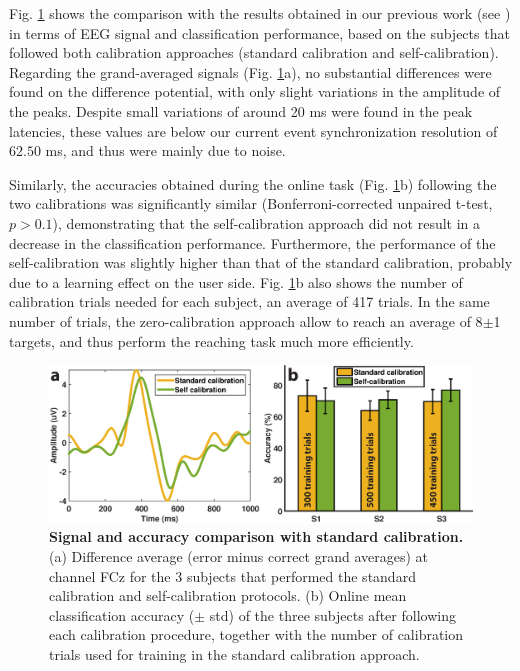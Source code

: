 Fig. \ref{fig:std_vs_sc} shows the comparison with the results obtained in our previous work (see \cite{iturrate13}) in terms of EEG signal and classification performance, based on the subjects that followed both calibration approaches (standard calibration and self-calibration). Regarding the grand-averaged signals (Fig. \ref{fig:std_vs_sc}a), no substantial differences were found on the difference potential, with only slight variations in the amplitude of the peaks. Despite small variations of around 20 ms were found in the peak latencies, these values are below our current event synchronization resolution of $62.50$ ms, and thus were mainly due to noise.

Similarly, the accuracies obtained during the online task (Fig. \ref{fig:std_vs_sc}b) following the two calibrations was significantly similar (Bonferroni-corrected unpaired t-test, $p>0.1$), demonstrating that the self-calibration approach did not result in a decrease in the classification performance. Furthermore, the performance of the self-calibration was slightly higher than that of the standard calibration, probably due to a learning effect on the user side. Fig.  \ref{fig:std_vs_sc}b also shows the number of calibration trials needed for each subject, an average of 417 trials. In the same number of trials, the zero-calibration approach allow to reach an average of 8$\pm$1 targets, and thus perform the reaching task much more efficiently.

\begin{figure}[htbp]
\centering
\includegraphics[width=\textwidth]{figures/standard_vs_selfcalibration.eps}
\caption{\textbf{Signal and accuracy comparison with standard calibration.} (a) Difference average (error minus correct grand averages) at channel FCz for the 3 subjects that performed the standard calibration and self-calibration protocols. (b) Online mean classification accuracy ($\pm$ std) of the three subjects after following each calibration procedure, together with the number of calibration trials used for training in the standard calibration approach.}
\label{fig:std_vs_sc}
\end{figure}

